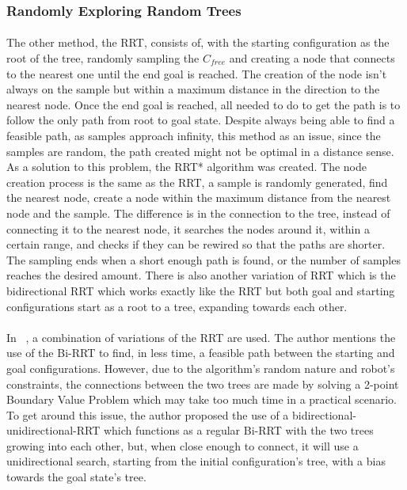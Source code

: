 \subsubsection{Randomly Exploring Random Trees}
\label{subsubsec:RRT}
\paragraph{}The other method, the \gls{RRT}, consists of, with the starting configuration as the root of the tree, randomly sampling the $C_{free}$ and creating a node that 
connects to the nearest one until the end goal is reached. The creation of the node isn’t always on the sample but within a maximum distance in the direction 
to the nearest node. Once the end goal is reached, all needed to do to get the path is to follow the only path from root to goal state. 
Despite always being able to find a feasible path, as samples approach infinity, this method as an issue, since the samples are random, the path created might 
not be optimal in a distance sense. As a solution to this problem, the RRT* algorithm was created. The node creation process is the same as the \gls{RRT}, a sample 
is randomly generated, find the nearest node, create a node within the maximum distance from the nearest node and the sample. The difference is in the 
connection to the tree, instead of connecting it to the nearest node, it searches the nodes around it, within a certain range, and checks if they can be 
rewired so that the paths are shorter. The sampling ends when a short enough path is found, or the number of samples reaches the desired amount. 
There is also another variation of \gls{RRT} which is the bidirectional \gls{RRT} which works exactly like the \gls{RRT} but both goal and starting configurations start 
as a root to a tree, expanding towards each other.

\paragraph{}In ~\cite{9638379}, a combination of variations of the \gls{RRT} are used. The author mentions the use of the Bi-RRT to find, in less time, a 
feasible path between the starting and goal configurations. However, due to the algorithm’s random nature and robot’s constraints, 
the connections between the two trees are made by solving a 2-point Boundary Value Problem which may take too much time in a practical scenario. 
To get around this issue, the author proposed the use of a bidirectional-unidirectional-RRT which functions as a regular Bi-RRT with the two trees growing into each other, 
but, when close enough to connect, it will use a unidirectional search, starting from the initial configuration’s tree, with a bias towards the goal state’s tree.

